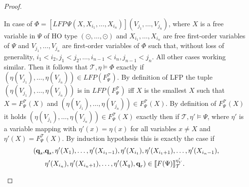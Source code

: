 \begin{proof}
\begin{compactitem}
        \item In case of $\Phi = [LFP\,\Psi(X, X_{i_1}, \dots, X_{i_n})](V_{j_1}, \dots, V_{j_n})$, where $X$ is a
        free variable in $\Psi$ of HO type $(\odot, \dots, \odot)$ and $X_{i_1}, \dots, X_{i_n}$ are free first-order
        variables of $\Psi$ and $V_{j_1}, \dots, V_{j_n}$ are first-order variables of $\Phi$ such that, without loss of generality, $i_1 < i_2, j_1 < j_2, \dots, i_{n-1} < i_ n, j_{n-1} < j_n$. All other cases working similar. Then it follows that
        $\mathcal{T}, \eta \models \Phi$ exactly if $(\eta(V_{j_1}), \dots, \eta(V_{j_n})) \in LFP
        (F_\Psi^\mathcal{T})$. By definition of LFP the tuple $(\eta(V_{j_1}), \dots, \eta(V_{j_n}))$ is in
        $LFP(F_\Psi^\mathcal{T})$ iff $X$ is the smallest $X$ such that $X = F_\Psi^\mathcal{T}(X)$ and $(\eta(V_{j_1}), \dots, \eta(V_{j_n})) \in
        F_\Psi^\mathcal{T}(X)$. By definition of $F_\Psi^\mathcal{T}(X)$ it holds $(\eta
        (V_{j_1}), \dots, \eta(V_{j_n})) \in F_\Psi^\mathcal{T}(X)$ exactly then if $\mathcal{T}, \eta' 
        \models \Psi$, where $\eta'$ is a variable mapping with $\eta'(x) = \eta(x)$ for all variables $x \neq X$ and $\eta'(X) = F_\Psi^\mathcal{T}(X)$. By induction hypothesis this is exactly the case if
        \begin{align*}
        (\emph{q}_s, &\emph{q}_s, \eta'(X_1), \dots, \eta'(X_{i_1-1}), \eta'(X_{i_1}), \eta'(X_{i_1+1}), \dots, \eta'(X_{i_n-1}), \\&\eta'(X_{i_n}), \eta'(X_{i_n+1}), \dots, \eta'
            (X_q), \emph{q}_r) \in \llbracket
        F(\Psi) \rrbracket^{\eta'_V}_\mathcal{T}.
        \end{align*}
        

\end{compactitem}
\end{proof}
